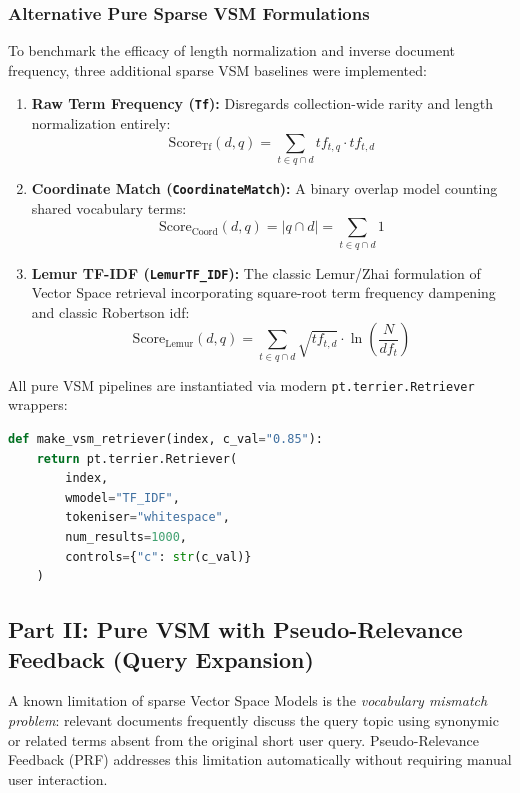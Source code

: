 \documentclass[10pt, a4paper]{article}
\begin{document}
\subsubsection{Alternative Pure Sparse VSM Formulations}
To benchmark the efficacy of length normalization and inverse document frequency, three additional sparse VSM baselines were implemented:
\begin{enumerate}[noitemsep,topsep=2pt]
    \item \textbf{Raw Term Frequency (\texttt{Tf}):} Disregards collection-wide rarity and length normalization entirely:
    \begin{equation}
    \text{Score}_{\text{Tf}}(d, q) = \sum_{t \in q \cap d} tf_{t,q} \cdot tf_{t,d}
    \end{equation}
    \item \textbf{Coordinate Match (\texttt{CoordinateMatch}):} A binary overlap model counting shared vocabulary terms:
    \begin{equation}
    \text{Score}_{\text{Coord}}(d, q) = |q \cap d| = \sum_{t \in q \cap d} 1
    \end{equation}
    \item \textbf{Lemur TF-IDF (\texttt{LemurTF\_IDF}):} The classic Lemur/Zhai formulation of Vector Space retrieval incorporating square-root term frequency dampening and classic Robertson idf:
    \begin{equation}
    \text{Score}_{\text{Lemur}}(d, q) = \sum_{t \in q \cap d} \sqrt{tf_{t,d}} \cdot \ln\left(\frac{N}{df_t}\right)
    \end{equation}
\end{enumerate}

All pure VSM pipelines are instantiated via modern \texttt{pt.terrier.Retriever} wrappers:
\begin{lstlisting}[language=Python]
def make_vsm_retriever(index, c_val="0.85"):
    return pt.terrier.Retriever(
        index,
        wmodel="TF_IDF",
        tokeniser="whitespace",
        num_results=1000,
        controls={"c": str(c_val)}
    )
\end{lstlisting}

\subsection{Part II: Pure VSM with Pseudo-Relevance Feedback (Query Expansion)}
\label{sec:impl_part2}

A known limitation of sparse Vector Space Models is the \textit{vocabulary mismatch problem}: relevant documents frequently discuss the query topic using synonymic or related terms absent from the original short user query. Pseudo-Relevance Feedback (PRF) addresses this limitation automatically without requiring manual user interaction.
\end{document}
